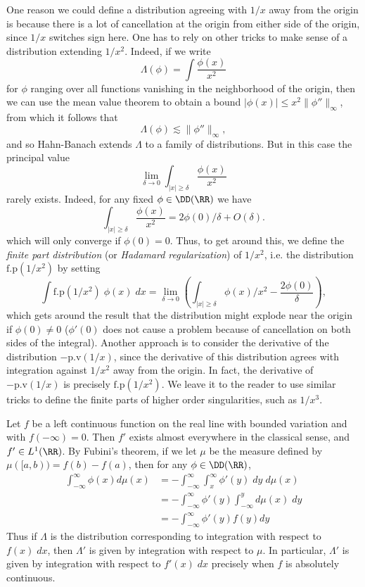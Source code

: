 \begin{example}
    One reason we could define a distribution agreeing with $1/x$ away from the origin is because there is a lot of cancellation at the origin from either side of the origin, since $1/x$ switches sign here. One has to rely on other tricks to make sense of a distribution extending $1/x^2$. Indeed, if we write
    \[ \Lambda(\phi) = \int \frac{\phi(x)}{x^2} \]
    for $\phi$ ranging over all functions vanishing in the neighborhood of the origin, then we can use the mean value theorem to obtain a bound $|\phi(x)| \leq x^2 \| \phi'' \|_\infty$, from which it follows that
    \[ \Lambda(\phi) \lesssim \| \phi'' \|_\infty, \]
    and so Hahn-Banach extends $\Lambda$ to a family of distributions. But in this case the principal value
    \[ \lim_{\delta \to 0} \int_{|x| \geq \delta} \frac{\phi(x)}{x^2} \]
    rarely exists. Indeed, for any fixed $\phi \in \DD(\RR)$ we have
    \[ \int_{|x| \geq \delta} \frac{\phi(x)}{x^2} = 2 \phi(0) / \delta + O(\delta). \]
    which will only converge if $\phi(0) = 0$. Thus, to get around this, we define the \emph{finite part distribution} (or \emph{Hadamard regularization}) of $1/x^2$, i.e. the distribution $\text{f.p}(1/x^2)$ by setting
    \[ \int \text{f.p}(1/x^2)\; \phi(x)\; dx = \lim_{\delta \to 0} \left( \int_{|x| \geq \delta} \phi(x)/x^2 - \frac{2 \phi(0)}{\delta} \right), \]
    which gets around the result that the distribution might explode near the origin if $\phi(0) \neq 0$ ($\phi'(0)$ does not cause a problem because of cancellation on both sides of the integral). Another approach is to consider the derivative of the distribution $- \text{p.v}(1/x)$, since the derivative of this distribution agrees with integration against $1/x^2$ away from the origin. In fact, the derivative of $- \text{p.v}(1/x)$ is precisely $\text{f.p}(1/x^2)$. We leave it to the reader to use similar tricks to define the finite parts of higher order singularities, such as $1/x^3$.
\end{example}

\begin{example}
    Let $f$ be a left continuous function on the real line with bounded variation and with $f(-\infty) = 0$. Then $f'$ exists almost everywhere in the classical sense, and $f' \in L^1(\RR)$. By Fubini's theorem, if we let $\mu$ be the measure defined by $\mu([a,b)) = f(b) - f(a)$, then for any $\phi \in \DD(\RR)$,
    \begin{align*}
        \int_{-\infty}^\infty \phi(x) d\mu(x) &= - \int_{-\infty}^\infty \int_x^\infty \phi'(y)\; dy\; d\mu(x)\\
        &= - \int_{-\infty}^\infty \phi'(y) \int_{-\infty}^y d\mu(x)\; dy\\
        &= - \int_{-\infty}^\infty \phi'(y) f(y) dy
    \end{align*}
    Thus if $\Lambda$ is the distribution corresponding to integration with respect to $f(x)\; dx$, then $\Lambda'$ is given by integration with respect to $\mu$. In particular, $\Lambda'$ is given by integration with respect to $f'(x)\; dx$ precisely when $f$ is absolutely continuous.
\end{example}

